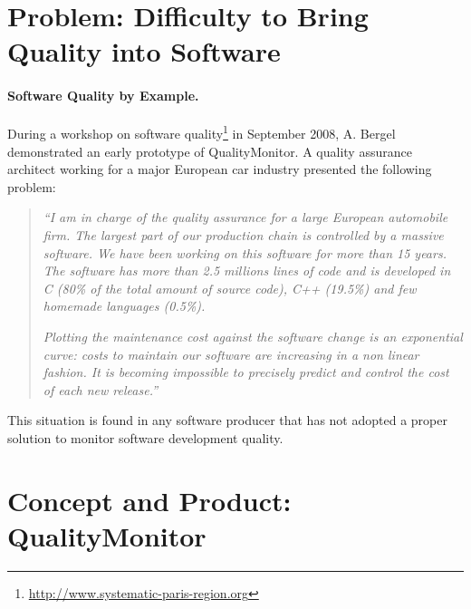\documentclass[runningheads]{llncs}
\newcommand{\ie}{\emph{i.e.,}\xspace}
\begin{document}
\section{Problem: Difficulty to Bring Quality into Software}


\paragraph{Software Quality by Example.}
During a workshop on software quality\footnote{\url{http://www.systematic-paris-region.org}} in September 2008, A. Bergel demonstrated an early prototype of QualityMonitor. A quality assurance architect working for a major European car industry presented the following problem:
\begin{quote}
\emph{``I am in charge of the quality assurance for a large European automobile firm. The largest part of our production chain is controlled by a massive software. We have been working on this software for more than 15 years. The software has more than 2.5 millions lines of code and is developed in C (80\% of the total amount of source code), C++ (19.5\%) and few homemade languages (0.5\%).}

\emph{Plotting the maintenance cost against the software change is an exponential curve: costs to maintain our software are increasing in a non linear fashion. It is becoming impossible to precisely predict and control the cost of each new release.''}
\end{quote}

This situation is found in any software producer that has not adopted a proper solution to monitor software development quality.


\section{Concept and Product: QualityMonitor}
\end{document}
